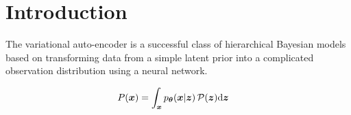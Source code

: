 \section{Introduction}
\label{sec:introduction}

The variational auto-encoder is a successful class of hierarchical Bayesian models based on transforming data from a simple latent prior into a complicated observation distribution using a neural network.

\begin{align*}
    P({\boldsymbol{x}}) &= \int_{\boldsymbol{x}} p_{{\boldsymbol \theta}}({\boldsymbol{x}} | {\boldsymbol z})\, \mathcal{P}({\boldsymbol z}) \mathrm{d}{\boldsymbol z}
\end{align*}




